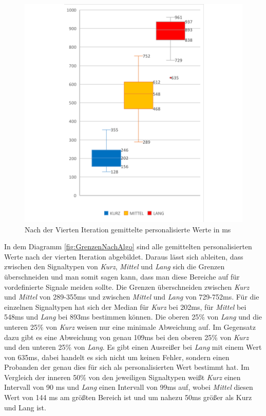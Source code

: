\begin{figure}[htbp] 
            \centering
   	\includegraphics[width=\textwidth]{pics/analyse/algo/MinMax/GrenzenNachAlgo.png}
	\caption{Nach der Vierten Iteration gemittelte personalisierte Werte in ms}
	\label{fig:GrenzenNachAlgo}
\end{figure}

In dem Diagramm \autoref{fig:GrenzenNachAlgo} sind alle gemittelten personalisierten Werte nach der vierten Iteration abgebildet. 
Daraus l{\"a}sst sich ableiten, dass zwischen den Signaltypen von \textit{Kurz}, \textit{Mittel} und \textit{Lang} sich die Grenzen {\"u}berschneiden und man somit sagen kann, dass man diese Bereiche auf f{\"u}r vordefinierte Signale meiden sollte. 
Die Grenzen {\"u}berschneiden zwischen \textit{Kurz} und \textit{Mittel} von 289-355ms und zwischen \textit{Mittel} und \textit{Lang} von 729-752ms.
F{\"u}r die einzelnen Signaltypen hat sich der Median f{\"u}r \textit{Kurz} bei 202ms, f{\"u}r \textit{Mittel} bei 548ms und \textit{Lang} bei 893ms bestimmen k{\"o}nnen.
Die oberen 25\% von \textit{Lang} und die unteren 25\% von \textit{Kurz} weisen nur eine minimale Abweichung auf. 
Im Gegensatz dazu gibt es eine Abweichung von genau 109ms bei den oberen 25\% von \textit{Kurz} und den unteren 25\% von \textit{Lang}.
Es gibt einen Ausrei{\ss}er bei \textit{Lang} mit einem Wert von 635ms, dabei handelt es sich nicht um keinen Fehler, sondern einen Probanden der genau dies f{\"u}r sich als personalisierten Wert bestimmt hat.
Im Vergleich der inneren 50\% von den jeweiligen Signaltypen wei{\ss}t \textit{Kurz} einen Intervall von 90 ms und \textit{Lang} einen Intervall von 99ms auf, wobei \textit{Mittel} diesen Wert von 144 ms am gr{\"o}{\ss}ten Bereich ist und um nahezu 50ms gr{\"o}{\ss}er als Kurz und Lang ist. 


